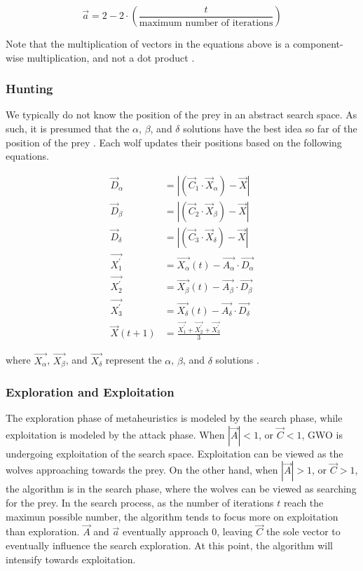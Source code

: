 $$
\vec{a} = 2 - 2 \cdot \left( \frac{t}{\text{maximum number of iterations}} \right)
$$

Note that the multiplication of vectors in the equations above is a component-wise multiplication, and not a dot product \cite{Mirjalili2020-MathModel}.

\subsubsection{Hunting}
We typically do not know the position of the prey in an abstract search space. As such, it is presumed that the $\alpha$, $\beta$, and $\delta$ solutions have the best idea so far of the position of the prey \cite{Mirjalili2014}. Each wolf updates their positions based on the following equations.

\begin{align}
	\vec{D}_{\alpha} &= \left | \left ( \vec{C}_{1} \cdot \vec{X}_{\alpha} \right ) - \vec{X} \right | \\
	\vec{D}_{\beta} &= \left | \left ( \vec{C}_{2} \cdot \vec{X}_{\beta} \right ) - \vec{X} \right | \\
	\vec{D}_{\delta} &= \left | \left ( \vec{C}_{3} \cdot \vec{X}_{\delta} \right ) - \vec{X} \right | \\
	\vec{X_{1}^{'}} &= \vec{X_{\alpha}}(t) - \vec{A_{\alpha}} \cdot \vec{D_{\alpha}} \\
	\vec{X_{2}^{'}} &= \vec{X_{\beta}}(t) - \vec{A_{\beta}} \cdot \vec{D_{\beta}} \\
	\vec{X_{3}^{'}} &= \vec{X_{\delta}}(t) - \vec{A_{\delta}} \cdot \vec{D_{\delta}} \\
	\vec{X}(t + 1)  &= \frac{\vec{X_{1}^{'}} + \vec{X_{2}^{'}} + \vec{X_{3}^{'}}}{3}
\end{align}

where $\vec{X_{\alpha}}$, $\vec{X_{\beta}}$, and $\vec{X_{\delta}}$ represent the $\alpha$, $\beta$, and $\delta$ solutions \cite{Gupta2018}.

\subsubsection{Exploration and Exploitation}
The exploration phase of metaheuristics is modeled by the search phase, while exploitation is modeled by the attack phase. When $\left| \vec{A} \right| < 1$, or $\vec{C} < 1$, GWO is undergoing exploitation of the search space. Exploitation can be viewed as the wolves approaching towards the prey. On the other hand, when $\left| \vec{A} \right| > 1$, or $\vec{C} > 1$, the algorithm is in the search phase, where the wolves can be viewed as searching for the prey. In the search process, as the number of iterations $t$ reach the maximun possible number, the algorithm tends to focus more on exploitation than exploration. $\vec{A}$ and $\vec{a}$ eventually approach $0$, leaving $\vec{C}$ the sole vector to eventually influence the search exploration. At this point, the algorithm will intensify towards exploitation. 